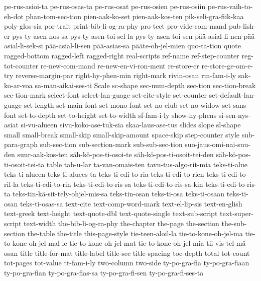 {  pe-rus-asioi-ta
  pe-rus-osas-ta
  pe-rus-osat
  pe-rus-osien
  pe-rus-osiin
  pe-rus-vaih-to-eh-dot
  phan-tom-sec-tion
  pien-aak-ko-set
  pien-aak-kos-ten
  pik-seli-gra-fiik-kaa
  poly-glos-sia
  por-trait
  print-bib-li-og-ra-phy
  pro-tect
  pro-vide-com-mand
  pub-lish-er
  pys-ty-asen-nos-sa
  pys-ty-asen-toi-sel-la
  pys-ty-asen-toi-sen
  pää-asial-li-nen
  pää-asial-li-sek-si
  pää-asial-li-sen
  pää-asias-sa
  pääte-oh-jel-mien
  quo-ta-tion
  quote
  ragged-bottom
  ragged-left
  ragged-right
  real-scripts
  ref-name
  ref-step-counter
  reg-tot-counter
  re-new-com-mand
  re-new-en-vi-ron-ment
  re-store-cr
  re-store-ge-om-e-try
  reverse-margin-par
  right-hy-phen-min
  right-mark
  rivin-osan
  rm-fam-i-ly
  sak-ko-ar-voa
  sa-man-aikai-ses-ti
  Scale
  sc-shape
  sec-num-depth
  sec-tion
  sec-tion-break
  sec-tion-mark
  select-font
  select-lan-guage
  set-cite-style
  set-counter
  set-default-lan-guage
  set-length
  set-main-font
  set-mono-font
  set-no-club
  set-no-widow
  set-sans-font
  set-to-depth
  set-to-height
  set-to-width
  sf-fam-i-ly
  show-hy-phens
  si-sen-nys-asiat
  si-vu-alueen
  sivu-koko-ase-tuk-sia
  skaa-laus-ase-tus
  slides
  slope
  sl-shape
  small
  small-break
  small-skip
  small-skip-amount
  space-skip
  step-counter
  style
  sub-para-graph
  sub-sec-tion
  sub-section-mark
  sub-sub-sec-tion
  suo-jaus-omi-nai-suu-den
  suur-aak-kos-ten
  säh-kö-pos-ti-osoi-te
  säh-kö-pos-ti-osoit-tei-den
  säh-kö-pos-ti-osoit-tei-ta
  table
  tab-u-lar
  ta-van-omais-ten
  tavu-tus-algo-rit-mia
  teks-ti-alue
  teks-ti-alueen
  teks-ti-aluees-ta
  teks-ti-edi-to-ria
  teks-ti-edi-to-rien
  teks-ti-edi-to-ril-la
  teks-ti-edi-to-rin
  teks-ti-edi-to-ris-sa
  teks-ti-edi-to-ris-sa-kin
  teks-ti-edi-to-ris-ta
  teks-tin-kä-sit-tely-ohjel-mis-sa
  teks-tin-osan
  teks-ti-osa
  teks-ti-osaan
  teks-ti-osan
  teks-ti-osas-sa
  text-cite
  text-comp-word-mark
  text-el-lip-sis
  text-en-glish
  text-greek
  text-height
  text-quote-dbl
  text-quote-single
  text-sub-script
  text-super-script
  text-width
  the-bib-li-og-ra-phy
  the-chapter
  the-page
  the-section
  the-sub-section
  the-table
  the-title
  this-page-style
  tie-teen-aloil-la
  tie-to-kone-oh-jel-ma
  tie-to-kone-oh-jel-mal-le
  tie-to-kone-oh-jel-mat
  tie-to-kone-oh-jel-mia
  tii-vis-tel-mä-osan
  title
  title-for-mat
  title-label
  title-sec
  title-spacing
  toc-depth
  total
  tot-count
  tot-pages
  tot-value
  tt-fam-i-ly
  two-column
  two-side
  ty-po-gra-fia
  ty-po-gra-fiaan
  ty-po-gra-fian
  ty-po-gra-fias-sa
  ty-po-gra-fi-sen
  ty-po-gra-fi-ses-ta
}
